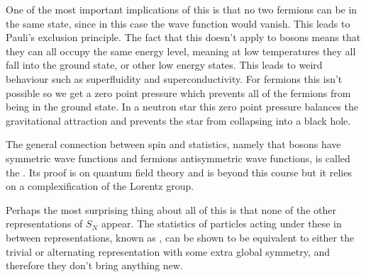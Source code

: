 One of the most important implications of this is that no two fermions can be in the same state, since in this case the wave function would vanish.
This leads to Pauli's exclusion principle.
The fact that this doesn't apply to bosons means that they can all occupy the same energy level, meaning at low temperatures they all fall into the ground state, or other low energy states.
This leads to weird behaviour such as superfluidity and superconductivity.
For fermions this isn't possible so we get a zero point pressure which prevents all of the fermions from being in the ground state.
In a neutron star this zero point pressure balances the gravitational attraction and prevents the star from collapsing into a black hole.

The general connection between spin and statistics, namely that bosons have symmetric wave functions and fermions antisymmetric wave functions, is called the .
Its proof is on quantum field theory and is beyond this course but it relies on a complexification of the Lorentz group.

Perhaps the most surprising thing about all of this is that none of the other representations of \(S_N\) appear.
The statistics of particles acting under these in between representations, known as , can be shown to be equivalent to either the trivial or alternating representation with some extra global symmetry, and therefore they don't bring anything new.